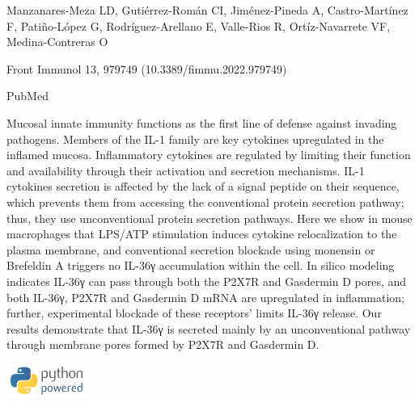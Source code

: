 \documentclass[
]{article}
\begin{document}
Manzanares-Meza LD, Gutiérrez-Román CI, Jiménez-Pineda A,
Castro-Martínez F, Patiño-López G, Rodríguez-Arellano E, Valle-Rios R,
Ortíz-Navarrete VF, Medina-Contreras O

Front Immunol 13, 979749 (10.3389/fimmu.2022.979749)

PubMed

Mucosal innate immunity functions as the first line of defense against
invading pathogens. Members of the IL-1 family are key cytokines
upregulated in the inflamed mucosa. Inflammatory cytokines are regulated
by limiting their function and availability through their activation and
secretion mechanisms. IL-1 cytokines secretion is affected by the lack
of a signal peptide on their sequence, which prevents them from
accessing the conventional protein secretion pathway; thus, they use
unconventional protein secretion pathways. Here we show in mouse
macrophages that LPS/ATP stimulation induces cytokine relocalization to
the plasma membrane, and conventional secretion blockade using monensin
or Brefeldin A triggers no IL-36γ accumulation within the cell. In
silico modeling indicates IL-36γ can pass through both the P2X7R and
Gasdermin D pores, and both IL-36γ, P2X7R and Gasdermin D mRNA are
upregulated in inflammation; further, experimental blockade of these
receptors' limits IL-36γ release. Our results demonstrate that IL-36γ is
secreted mainly by an unconventional pathway through membrane pores
formed by P2X7R and Gasdermin D.

\includegraphics{images/python.png}
\end{document}
